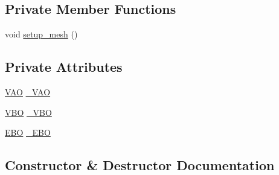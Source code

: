 \subsection*{Private Member Functions}
\begin{DoxyCompactItemize}
\item 
void \hyperlink{classLarp_1_1Mesh_af1c7441ca21e77717edc513865c49c93}{setup\+\_\+mesh} ()
\end{DoxyCompactItemize}
\subsection*{Private Attributes}
\begin{DoxyCompactItemize}
\item 
\hyperlink{namespaceLarp_a459edfbf6a0def594cfeb6ecaa5d702e}{V\+AO} \hyperlink{classLarp_1_1Mesh_a94ba362a5c5682adf83257c29d3e1574}{\+\_\+\+V\+AO}
\item 
\hyperlink{namespaceLarp_ac6c5fe9357b92190f95c04109eb8c4f1}{V\+BO} \hyperlink{classLarp_1_1Mesh_a222c9e89d16765db6a6362127a0613f7}{\+\_\+\+V\+BO}
\item 
\hyperlink{namespaceLarp_ade08f6d3b342a72949ce18e017840030}{E\+BO} \hyperlink{classLarp_1_1Mesh_a4495c5145f7f75ec64f848907695be11}{\+\_\+\+E\+BO}
\end{DoxyCompactItemize}


\subsection{Constructor \& Destructor Documentation}
